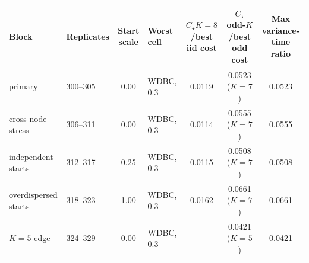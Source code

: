 \begin{tabular}{llclccc}
\toprule
Block & Replicates & Start scale & Worst cell & $C_\star K=8$/best iid cost & $C_\star$ odd-$K$/best odd cost & Max variance-time ratio \\
\midrule
primary & 300--305 & 0.00 & WDBC, 0.3 & 0.0119 & 0.0523 ($K=7$) & 0.0523 \\
cross-node stress & 306--311 & 0.00 & WDBC, 0.3 & 0.0114 & 0.0555 ($K=7$) & 0.0555 \\
independent starts & 312--317 & 0.25 & WDBC, 0.3 & 0.0115 & 0.0508 ($K=7$) & 0.0508 \\
overdispersed starts & 318--323 & 1.00 & WDBC, 0.3 & 0.0162 & 0.0661 ($K=7$) & 0.0661 \\
$K=5$ edge & 324--329 & 0.00 & WDBC, 0.3 & -- & 0.0421 ($K=5$) & 0.0421 \\
\bottomrule
\end{tabular}
